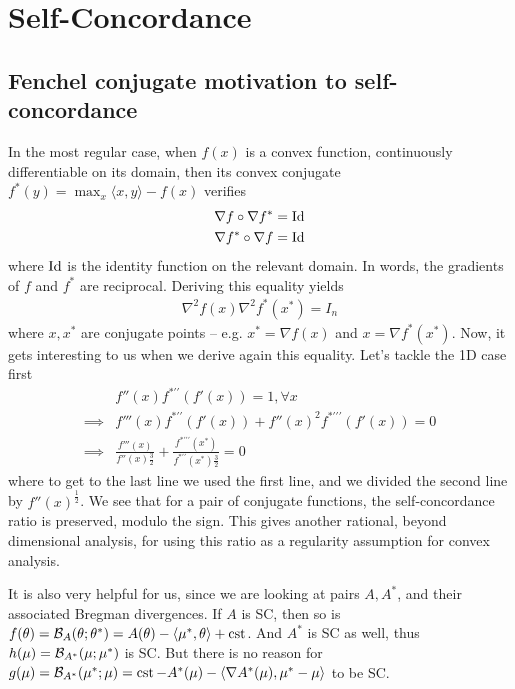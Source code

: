 \documentclass{article}
\newcommand{\logpart}{A}
\newcommand{\conj}{\logpart^*}
\newcommand{\bregman}{\cB_\logpart}
\newcommand{\bregmanconj}{\cB_{\logpart^*}}
\newcommand{\natp}{\theta}
\newcommand{\meanp}{\mu}
\begin{document}
\section{Self-Concordance}

\subsection{Fenchel conjugate motivation to self-concordance}

In the most regular case, when $f(x)$ is a convex function, continuously differentiable on its domain, then its convex conjugate $f^*(y) = \max_x \langle x, y \rangle - f(x)$ verifies
\begin{align}
    \nabla f \circ \nabla f^*  &= \mathrm{Id} \\
     \nabla f^* \circ \nabla f &= \mathrm{Id}
\end{align}
where $\mathrm{Id}$ is the identity function on the relevant domain. In words, the gradients of $f$ and $f^*$ are reciprocal.
Deriving this equality yields
\begin{align}
    \nabla^2 f(x) \nabla^2 f^*(x^*) = I_n
\end{align}
where $x,x^*$ are conjugate points -- e.g. $x^*=\nabla f(x)$ and $x = \nabla f^*(x^*)$.
Now, it gets interesting to us when we derive again this equality. Let's tackle the 1D case first
\begin{align}
    &f''(x) f^{* \prime \prime}(f'(x)) = 1, \forall x \\
    \implies
    &f'''(x)f^{* \prime \prime}(f'(x))  + f''(x)^2 f^{* \prime \prime \prime}(f'(x))  = 0 \\
    \implies
    &\frac{f'''(x)}{f''(x){\frac{3}{2}}}  + \frac{f^{* \prime \prime \prime}(x^*)}{f^{* \prime \prime}(x^*){\frac{3}{2}}}  = 0
\end{align}
where to get to the last line we used the first line, and we divided the second line by $f''(x)^{\frac{1}{2}}$. 
We see that for a pair of conjugate functions, the self-concordance ratio is preserved, modulo the sign.
This gives another rational, beyond dimensional analysis, for using this ratio as a regularity assumption for convex analysis. 

It is also very helpful for us, since we are looking at pairs $\logpart, \conj$, and their associated Bregman divergences. 
If $\logpart$ is SC, then so is 
$f(\natp)= \bregman(\natp ; \natp^*) = \logpart(\natp) - \langle \meanp^*, \natp \rangle + \cst$. 
And $\conj$ is SC as well, thus  $h(\meanp) = \bregmanconj ( \meanp ; \meanp^*)$ is SC.
But there is no reason for 
$g(\meanp) = \bregmanconj ( \meanp^* ; \meanp) =  \cst - \conj(\meanp) - \langle \nabla \conj (\meanp), \meanp^* - \meanp \rangle $ to be SC. 
\end{document}
